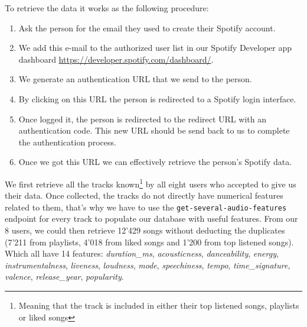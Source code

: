 To retrieve the data it works as the following procedure:
\begin{enumerate}
    \item Ask the person for the email they used to create their Spotify account.
    \item We add this e-mail to the authorized user list in our Spotify Developer app dashboard \url{https://developer.spotify.com/dashboard/}.
    \item We generate an authentication URL that we send to the person.
    \item By clicking on this URL the person is redirected to a Spotify login interface.
    \item Once logged it, the person is redirected to the redirect URL with an authentication code. This new URL should be send back to us to complete the authentication process.
    \item Once we got this URL we can effectively retrieve the person's Spotify data.
\end{enumerate}

We first retrieve all the tracks known\footnote{Meaning that the track is included in either their top listened songs, playlists or liked songs} by all eight users who accepted to give us their data. Once collected, the tracks do not directly have numerical features related to them, that's why we have to use the \texttt{get-several-audio-features} endpoint for every track to populate our database with useful features. From our 8 users, we could then retrieve 12'429 songs without deducting the duplicates (7'211 from playlists, 4'018 from liked songs and 1'200 from top listened songs). Which all have 14 features: \textit{duration\_ms}, \textit{acousticness}, \textit{danceability}, \textit{energy}, \textit{instrumentalness}, \textit{liveness}, \textit{loudness}, \textit{mode}, \textit{speechiness}, \textit{tempo}, \textit{time\_signature}, \textit{valence}, \textit{release\_year}, \textit{popularity}.

